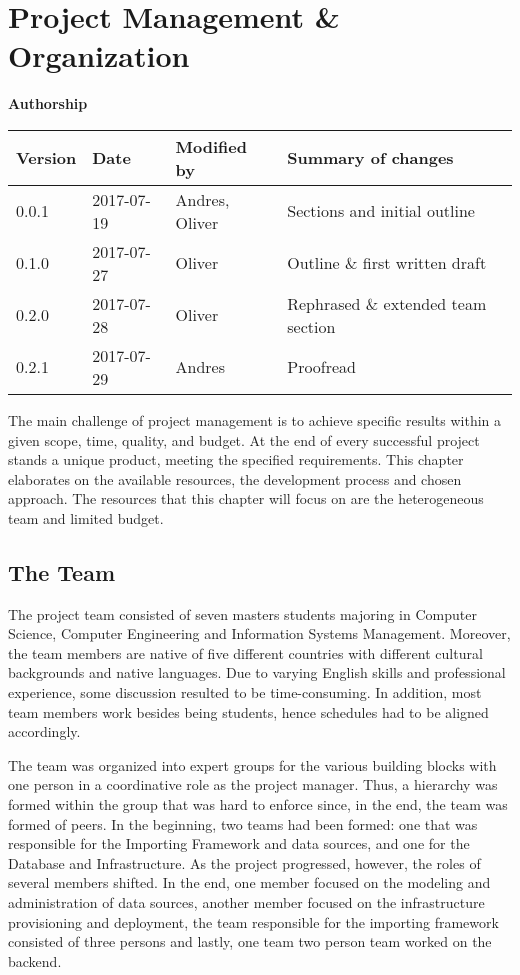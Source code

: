 \section{Project Management \& Organization}\label{sec:organization}

\textbf{Authorship}

\begin{longtable}[]{@{}llll@{}}
\toprule
Version & Date & Modified by & Summary of changes\tabularnewline
\midrule
\endhead
0.0.1 & 2017-07-19 & Andres, Oliver & Sections and initial
outline\tabularnewline
0.1.0 & 2017-07-27 & Oliver & Outline \& first written
draft\tabularnewline
0.2.0 & 2017-07-28 & Oliver & Rephrased \& extended team
section\tabularnewline
0.2.1 & 2017-07-29 & Andres & Proofread\tabularnewline
\bottomrule
\end{longtable}

The main challenge of project management is to achieve specific results
within a given scope, time, quality, and budget. At the end of every
successful project stands a unique product, meeting the specified
requirements. This chapter elaborates on the available resources, the
development process and chosen approach. The resources that this chapter
will focus on are the heterogeneous team and limited budget.

\subsection{The Team}\label{the-team}

The project team consisted of seven masters students majoring in
Computer Science, Computer Engineering and Information Systems
Management. Moreover, the team members are native of five different
countries with different cultural backgrounds and native languages. Due
to varying English skills and professional experience, some discussion
resulted to be time-consuming. In addition, most team members work besides
being students, hence schedules had to be aligned accordingly.

The team was organized into expert groups for the various building
blocks with one person in a coordinative role as the project manager.
Thus, a hierarchy was formed within the group that was hard to enforce
since, in the end, the team was formed of peers. In the beginning, two
teams had been formed: one that was responsible for the Importing
Framework and data sources, and one for the Database and Infrastructure.
As the project progressed, however, the roles of several members shifted. In
the end, one member focused on the modeling and administration of data
sources, another member focused on the infrastructure provisioning and
deployment, the team responsible for the importing framework consisted
of three persons and lastly, one team two person team worked on the
backend.

